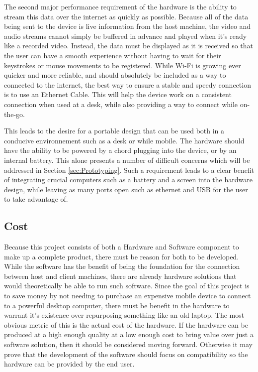 The second major performance requirement of the hardware is the ability to stream this data over the internet as quickly as possible.
Because all of the data being sent to the device is live information from the host machine, the video and audio streams cannot simply be buffered in advance and played when it's ready like a recorded video.
Instead, the data must be displayed as it is received so that the user can have a smooth experience without having to wait for their keystrokes or mouse movements to be registered.
While Wi-Fi is growing ever quicker and more reliable, and should absolutely be included as a way to connected to the internet, the best way to ensure a stable and speedy connection is to use an Ethernet Cable.
This will help the device work on a consistent connection when used at a desk, while also providing a way to connect while on-the-go.

This leads to the desire for a portable design that can be used both in a conducive environnement such as a desk or while mobile.
The hardware should have the ability to be powered by a chord plugging into the device, or by an internal battery.
This alone presents a number of difficult concerns which will be addressed in Section \ref{sec:Prototyping}.
Such a requirement leads to a clear benefit of integrating crucial computers such as a battery and a screen into the hardware design, while leaving as many ports open such as ethernet and USB for the user to take advantage of.


\subsection{Cost}\label{sec:HardwareCost}

Because this project consists of both a Hardware and Software component to make up a complete product, there must be reason for both to be developed.
While the software has the benefit of being the foundation for the connection between host and client machines, there are already hardware solutions that would theoretically be able to run such software.
Since the goal of this project is to save money by not needing to purchase an expensive mobile device to connect to a powerful desktop computer, there must be benefit in the hardware to warrant it's existence over repurposing something like an old laptop.
The most obvious metric of this is the actual cost of the hardware.
If the hardware can be produced at a high enough quality at a low enough cost to bring value over just a software solution, then it should be considered moving forward.
Otherwise it may prove that the development of the software should focus on compatibility so the hardware can be provided by the end user.

